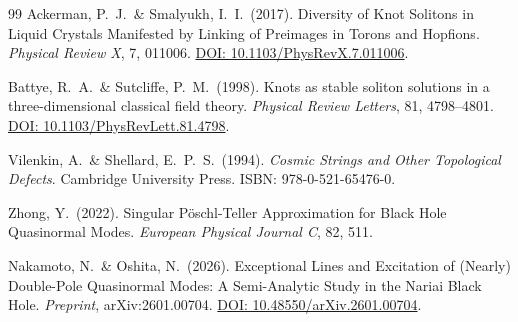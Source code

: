 \documentclass[aps,prd,twocolumn,superscriptaddress,nofootinbib]{revtex4-2}
\begin{document}
\begin{thebibliography}{99}
Ackerman, P.~J.\ \& Smalyukh, I.~I.\ (2017).
Diversity of Knot Solitons in Liquid Crystals Manifested by Linking of Preimages in Torons and Hopfions.
\textit{Physical Review X}, 7, 011006.
\href{https://doi.org/10.1103/PhysRevX.7.011006}{DOI: 10.1103/PhysRevX.7.011006}.

Battye, R.~A.\ \& Sutcliffe, P.~M.\ (1998).
Knots as stable soliton solutions in a three-dimensional classical field theory.
\textit{Physical Review Letters}, 81, 4798--4801.
\href{https://doi.org/10.1103/PhysRevLett.81.4798}{DOI: 10.1103/PhysRevLett.81.4798}.

Vilenkin, A.\ \& Shellard, E.~P.~S.\ (1994).
\textit{Cosmic Strings and Other Topological Defects}.
Cambridge University Press. ISBN: 978-0-521-65476-0.

Zhong, Y.\ (2022).
Singular P\"oschl-Teller Approximation for Black Hole Quasinormal Modes.
\textit{European Physical Journal C}, 82, 511.

Nakamoto, N.\ \& Oshita, N.\ (2026).
Exceptional Lines and Excitation of (Nearly) Double-Pole Quasinormal Modes: A Semi-Analytic Study in the Nariai Black Hole.
\textit{Preprint}, arXiv:2601.00704.
\href{https://doi.org/10.48550/arXiv.2601.00704}{DOI: 10.48550/arXiv.2601.00704}.

\end{thebibliography}
\end{document}
